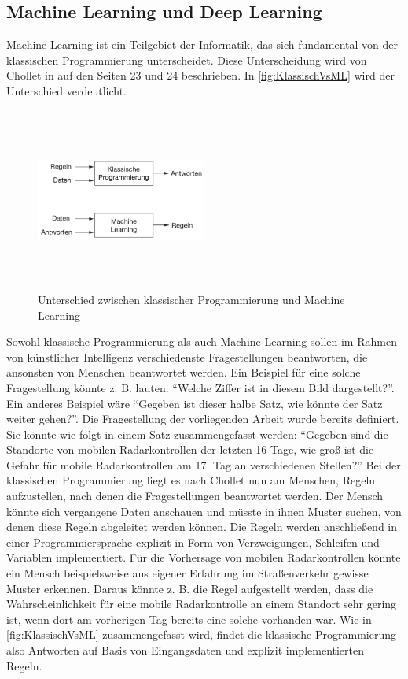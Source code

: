 \subsection{Machine Learning und Deep Learning}
\label{sec:MachineDeepLearning}

Machine Learning ist ein Teilgebiet der Informatik, das sich fundamental von der klassischen Programmierung unterscheidet.
Diese Unterscheidung wird von Chollet in \cite{DeepLearningPythonKeras} auf den Seiten 23 und 24 beschrieben.
In \autoref{fig:KlassischVsML} wird der Unterschied verdeutlicht.

\begin{figure}[h]
    \centering
    \includegraphics[width=0.5\textwidth,height=6cm,keepaspectratio=true]{content/images/KlassischVsML.png}
    \caption{Unterschied zwischen klassischer Programmierung und Machine Learning \cite[Abb.~1.2]{DeepLearningPythonKeras}}
    \label{fig:KlassischVsML}
\end{figure}

Sowohl klassische Programmierung als auch Machine Learning sollen im Rahmen von künstlicher Intelligenz verschiedenste Fragestellungen beantworten, die ansonsten von Menschen beantwortet werden.
Ein Beispiel für eine solche Fragestellung könnte z. B. lauten: "`Welche Ziffer ist in diesem Bild dargestellt?"'.
Ein anderes Beispiel wäre "`Gegeben ist dieser halbe Satz, wie könnte der Satz weiter gehen?"'.
Die Fragestellung der vorliegenden Arbeit wurde bereits definiert.
Sie könnte wie folgt in einem Satz zusammengefasst werden:
"`Gegeben sind die Standorte von mobilen Radarkontrollen der letzten 16 Tage, wie groß ist die Gefahr für mobile Radarkontrollen am 17. Tag an verschiedenen Stellen?"'
Bei der klassischen Programmierung liegt es nach Chollet nun am Menschen, Regeln aufzustellen, nach denen die Fragestellungen beantwortet werden.
Der Mensch könnte sich vergangene Daten anschauen und müsste in ihnen Muster suchen, von denen diese Regeln abgeleitet werden können.
Die Regeln werden anschließend in einer Programmiersprache explizit in Form von Verzweigungen, Schleifen und Variablen implementiert.
Für die Vorhersage von mobilen Radarkontrollen könnte ein Mensch beispielsweise aus eigener Erfahrung im Straßenverkehr gewisse Muster erkennen.
Daraus könnte z. B. die Regel aufgestellt werden, dass die Wahrscheinlichkeit für eine mobile Radarkontrolle an einem Standort sehr gering ist, wenn dort am vorherigen Tag bereits eine solche vorhanden war.
Wie in \autoref{fig:KlassischVsML} zusammengefasst wird, findet die klassische Programmierung also Antworten auf Basis von Eingangsdaten und explizit implementierten Regeln.

